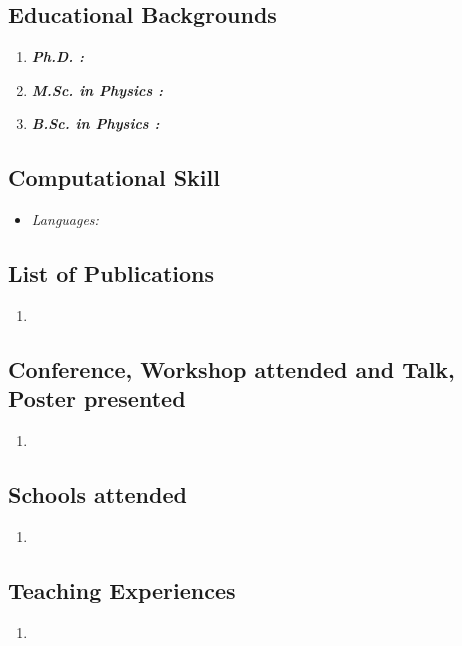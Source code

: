 \documentclass[a4paper,11pt,Times New Roman]{article}
\begin{document}
\subsection{Educational Backgrounds}
\begin{enumerate}[label=\Roman*.]
	\item \textbf{ \textit{Ph.D. :}}  
	\item \textbf{ \textit{M.Sc. in Physics :}} 
	\item \textbf{ \textit{B.Sc. in Physics :}} 
\end{enumerate}



\subsection{Computational Skill}
\begin{itemize}

\item \textit{Languages:} 
\end{itemize}



\subsection{List of Publications}
\begin{enumerate}[label=\Roman*.]
	\item		
\end{enumerate}



 \subsection{Conference, Workshop attended and Talk, Poster presented}
 \begin{enumerate}[label=\Roman*.]
 \item
\end{enumerate}

\subsection{Schools attended}
\begin{enumerate}[label=\Roman*.]
\item
\end{enumerate}



\subsection{Teaching Experiences}
\begin{enumerate}[label=\Roman*.]
\item
\end{enumerate}
\end{document}
